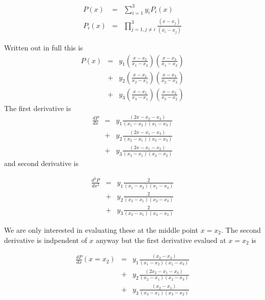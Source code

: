 \documentclass{article}
\begin{document}
\begin{eqnarray}
P(x) & = & \sum_{i=1}^{3} y_i P_i(x) \\
P_i(x) & = & \prod_{j=1, j \ne i}^{3} \frac{\left( x-x_j \right)}{ \left( x_i - x_j \right)}
\end{eqnarray}

Written out in full this is
\begin{eqnarray}
P(x) & = & y_1 \left(\frac{x-x_2}{x_1-x_2}\right) \left( \frac{x-x_3}{x_1-x_3}\right) \nonumber \\
     & + & y_2 \left(\frac{x-x_1}{x_2-x_1}\right) \left( \frac{x-x_3}{x_2-x_3}\right) \nonumber \\
     & + & y_3 \left(\frac{x-x_1}{x_3-x_1}\right) \left( \frac{x-x_2}{x_3-x_2}\right) \nonumber
\end{eqnarray}
The first derivative is
\begin{eqnarray}
\frac{dP}{dx} & = & y_1 \frac{\left(2x-x_2-x_3 \right)}{\left(x_1-x_2\right)\left(x_1-x_3\right)} \nonumber \\
     & + & y_2 \frac{\left(2x-x_1-x_3 \right)}{\left(x_2-x_1\right)\left(x_2-x_3\right)} \nonumber \\
     & + & y_3 \frac{\left(2x-x_1-x_2 \right)}{\left(x_3-x_1\right)\left(x_3-x_2\right)} \nonumber
\end{eqnarray}
and second derivative is

\begin{eqnarray}
\frac{d^2P}{dx^2} & = & y_1 \frac{2}{\left(x_1-x_2\right)\left(x_1-x_3\right)} \nonumber \\
     & + & y_2 \frac{2}{\left(x_2-x_1\right)\left(x_2-x_3\right)} \nonumber \\
     & + & y_3 \frac{2}{\left(x_3-x_1\right)\left(x_3-x_2\right)} \nonumber
\end{eqnarray}

We are only interested in evaluating these at the middle point $x=x_2$. The second derivative is
indpendent of $x$ anyway but the first derivative evalued at $x=x_2$ is

\begin{eqnarray}
\frac{dP}{dx}(x=x_2) & = & y_1 \frac{\left(x_2-x_3 \right)}{\left(x_1-x_2\right)\left(x_1-x_3\right)} \nonumber \\
     & + & y_2 \frac{\left(2x_2-x_1-x_3 \right)}{\left(x_2-x_1\right)\left(x_2-x_3\right)} \nonumber \\
     & + & y_3 \frac{\left(x_2-x_1 \right)}{\left(x_3-x_1\right)\left(x_3-x_2\right)} \nonumber
\end{eqnarray}
\end{document}
